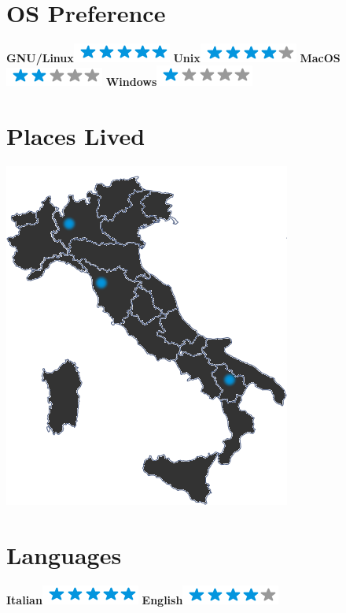 \documentclass[]{friggeri-cv}
\begin{document}
\begin{aside}
~
~
~
  \section{OS Preference}
    \textbf{GNU/Linux}\includegraphics[scale=0.40]{img/5stars.png}
    \textbf{Unix}\includegraphics[scale=0.40]{img/4stars.png}
    \textbf{MacOS}\includegraphics[scale=0.40]{img/2stars.png}
    \textbf{Windows}\includegraphics[scale=0.40]{img/1stars.png}
    ~
  \section{Places Lived}
    \includegraphics[scale=0.25]{img/italia.png}
    ~
  \section{Languages}
    \textbf{Italian}\includegraphics[scale=0.40]{img/5stars.png}
    \textbf{English}\includegraphics[scale=0.40]{img/4stars.png}
    ~
\end{aside}
\end{document}
